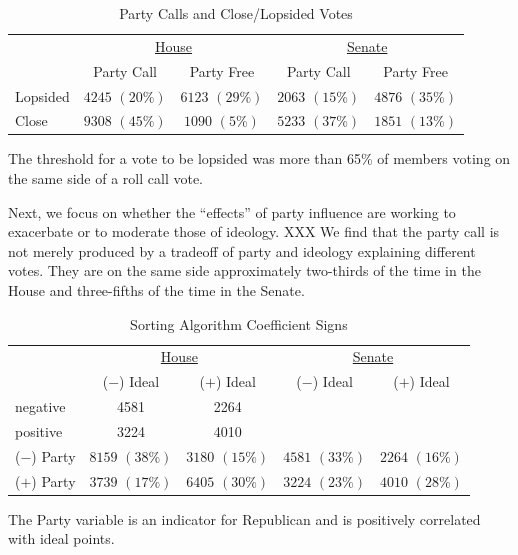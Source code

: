 \documentclass[12pt]{article}
\begin{document}
\begin{table}[H]
\centering
\begin{threeparttable}
\label{tab-close-lop}
\singlespacing
\caption{Party Calls and Close/Lopsided Votes}
\begin{tabular}{l cc cc}
\hline
&\multicolumn{2}{c}{\underline{House}}&\multicolumn{2}{c}{\underline{Senate}}\\
         & Party Call      & Party Free      & Party Call      & Party Free \\
\hline
Lopsided & $4245$ $(20\%)$ & $6123$ $(29\%)$ & $2063$ $(15\%)$ & $4876$ $(35\%)$ \\
Close    & $9308$ $(45\%)$ & $1090$ $(5\%)$  & $5233$ $(37\%)$ & $1851$ $(13\%)$ \\
\hline
\end{tabular}
\begin{tablenotes}
   \item
   The threshold for a vote to be lopsided was more than 65\% of members voting on the same side of a roll call vote.
 \end{tablenotes}
\end{threeparttable}
\end{table}

Next, we focus on whether the ``effects'' of party influence are working to exacerbate or to moderate those of ideology.
XXX
We find that the party call is not merely produced by a tradeoff of party and ideology explaining different votes.  They are on the same side approximately two-thirds of the time in the House and three-fifths of the time in the Senate.

\begin{table}[!htbp]
\centering
\begin{threeparttable}
\label{tab-sorting}
\singlespacing
\caption{Sorting Algorithm Coefficient Signs}
\begin{tabular}{l cc cc}
\hline
&\multicolumn{2}{c}{\underline{House}}&\multicolumn{2}{c}{\underline{Senate}}\\
& ($-$) Ideal & ($+$) Ideal & ($-$) Ideal & ($+$) Ideal \\
\hline
negative & 4581 & 2264 \\
  positive & 3224 & 4010 \\
($-$) Party & $8159$ $(38\%)$ & $3180$ $(15\%)$ & $4581$ $(33\%)$ & $2264$ $(16\%)$ \\
($+$) Party & $3739$ $(17\%)$ & $6405$ $(30\%)$ & $3224$ $(23\%)$ & $4010$ $(28\%)$ \\
\hline
\end{tabular}
\begin{tablenotes}
   \item
   The Party variable is an indicator for Republican and is positively correlated with ideal points.
 \end{tablenotes}
\end{threeparttable}
\end{table}
\end{document}
